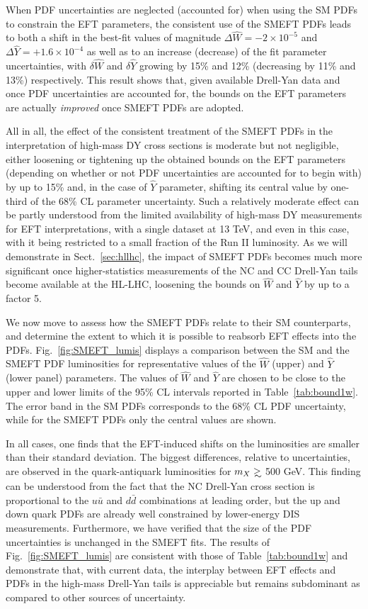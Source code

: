 \documentclass[withindex,glossary]{cam-thesis}
\def\gsim{\mathrel{\rlap{\lower4pt\hbox{\hskip1pt$\sim$}}
    \raise1pt\hbox{$>$}}}
\begin{document}
When PDF uncertainties are neglected (accounted for) when using the SM PDFs
to constrain the EFT parameters,
 the consistent use of the SMEFT PDFs leads to both a shift
in the best-fit values of magnitude $\Delta\hat{W}=-2\times 10^{-5}$
and $\Delta\hat{Y}=+1.6\times 10^{-4}$ 
as well as to an increase (decrease) of the fit parameter uncertainties, with $\delta \hat{W}$
and $\delta \hat{Y}$ growing by 15\% and 12\% (decreasing by
11\% and  13\%) respectively.
%
This result shows that, given available Drell-Yan data and once PDF uncertainties
are accounted for, the bounds on the EFT parameters are actually {\it improved}
once SMEFT PDFs are adopted.

All in all, the effect of the consistent treatment of the SMEFT PDFs
in the interpretation of high-mass DY cross sections
is moderate but not negligible, either loosening or tightening up the obtained
bounds on the EFT parameters (depending on whether or not PDF uncertainties
are accounted for to begin with) by up to 15\% and, in the case of
$\hat{Y}$ parameter, shifting its central value by  one-third
of the 68\% CL parameter uncertainty.
%
Such a relatively moderate effect can be partly understood from the limited availability
of high-mass DY measurements for
EFT interpretations, with a single dataset at 13 TeV, and even in this case, with it being restricted to
a small fraction of the Run II luminosity.
%
As we will demonstrate in Sect.~\ref{sec:hllhc}, the impact of SMEFT
PDFs  becomes much more significant once higher-statistics measurements of the NC and CC Drell-Yan tails
become available at the HL-LHC, loosening the bounds on $\hat{W}$ and $\hat{Y}$
by up to a factor 5.

We now move to assess how the SMEFT PDFs relate to their SM counterparts,
and determine the extent to which it is possible to reabsorb EFT effects into the PDFs.
%
Fig.~\ref{fig:SMEFT_lumis} displays a
comparison between the SM and the SMEFT PDF luminosities 
for representative values of the $\hat{W}$ (upper) and $\hat{Y}$ (lower panel) parameters.
  The values of $\hat{W}$ and $\hat{Y}$ are chosen to be close 
  to the upper and lower limits of the 95\% CL intervals reported in Table~\ref{tab:bound1w}.
  The error band in the SM PDFs corresponds to the 68\% CL PDF uncertainty, while for the SMEFT
  PDFs only the central values are shown.

In all cases, one finds that the EFT-induced shifts on the luminosities are smaller
than their standard deviation.
%
The biggest differences, relative to uncertainties, are observed in the
quark-antiquark luminosities for $m_X \gsim$ 500 GeV.
This finding can be understood from the fact that the NC Drell-Yan cross section
is proportional to the $u\bar{u}$ and $d\bar{d}$ combinations at leading order,
but the up and down quark PDFs are already well constrained by lower-energy DIS measurements.
%
Furthermore, we have verified
that the size of the PDF uncertainties is unchanged in the SMEFT fits.
The results of  Fig.~\ref{fig:SMEFT_lumis} are consistent with those of 
Table~\ref{tab:bound1w} and demonstrate
that, with current data, the interplay between EFT effects and 
PDFs in the high-mass Drell-Yan tails
is appreciable but remains subdominant as compared to other sources of uncertainty.
\end{document}
